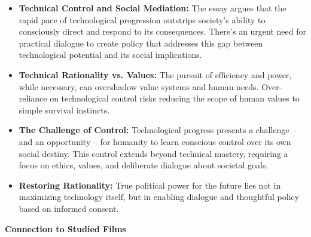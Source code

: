 \documentclass[11pt,fleqn]{book}
\begin{document}
\begin{itemize}
\item \textbf{Technical Control and Social Mediation:} The essay argues that the rapid pace of technological progression outstrips society's ability to consciously direct and respond to its consequences.  There's an urgent need for practical dialogue to create policy that addresses this gap between technological potential and its social implications. 

\item \textbf{Technical Rationality vs. Values:}  The pursuit of efficiency and power, while necessary, can overshadow value systems and human needs.  Over-reliance on technological control risks reducing the scope of human values to simple survival instincts. 

\item \textbf{The Challenge of Control:} Technological progress presents a challenge – and an opportunity – for  humanity to learn conscious control over its own social destiny. This control extends beyond technical mastery, requiring a focus on ethics, values, and deliberate dialogue about societal goals.

\item \textbf{Restoring Rationality:} True political power for the future lies not in maximizing technology itself, but in enabling dialogue and thoughtful policy based on informed consent.
\end{itemize}
\vspace{5pt}
\textbf{Connection to Studied Films}
\end{document}

